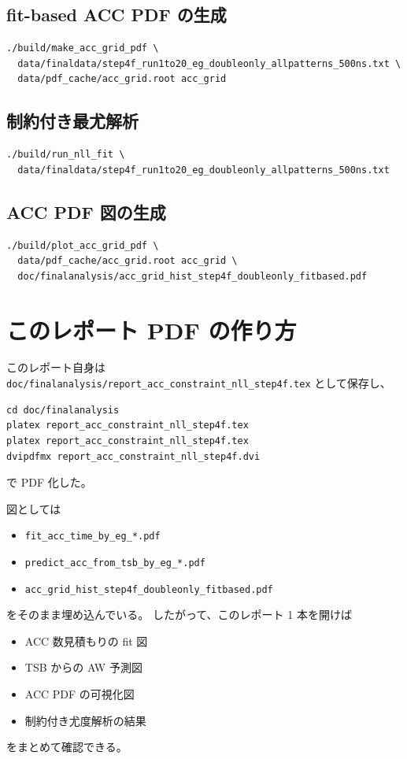 \documentclass[a4paper,11pt]{jsarticle}
\begin{document}
\subsection{fit-based ACC PDF の生成}
\begin{verbatim}
./build/make_acc_grid_pdf \
  data/finaldata/step4f_run1to20_eg_doubleonly_allpatterns_500ns.txt \
  data/pdf_cache/acc_grid.root acc_grid
\end{verbatim}

\subsection{制約付き最尤解析}
\begin{verbatim}
./build/run_nll_fit \
  data/finaldata/step4f_run1to20_eg_doubleonly_allpatterns_500ns.txt
\end{verbatim}

\subsection{ACC PDF 図の生成}
\begin{verbatim}
./build/plot_acc_grid_pdf \
  data/pdf_cache/acc_grid.root acc_grid \
  doc/finalanalysis/acc_grid_hist_step4f_doubleonly_fitbased.pdf
\end{verbatim}

\section{このレポート PDF の作り方}
このレポート自身は
\texttt{doc/finalanalysis/report\_acc\_constraint\_nll\_step4f.tex}
として保存し、
\begin{verbatim}
cd doc/finalanalysis
platex report_acc_constraint_nll_step4f.tex
platex report_acc_constraint_nll_step4f.tex
dvipdfmx report_acc_constraint_nll_step4f.dvi
\end{verbatim}
で PDF 化した。

図としては
\begin{itemize}
  \item \texttt{fit\_acc\_time\_by\_eg\_*.pdf}
  \item \texttt{predict\_acc\_from\_tsb\_by\_eg\_*.pdf}
  \item \texttt{acc\_grid\_hist\_step4f\_doubleonly\_fitbased.pdf}
\end{itemize}
をそのまま埋め込んでいる。
したがって、このレポート 1 本を開けば
\begin{itemize}
  \item ACC 数見積もりの fit 図
  \item TSB からの AW 予測図
  \item ACC PDF の可視化図
  \item 制約付き尤度解析の結果
\end{itemize}
をまとめて確認できる。
\end{document}
